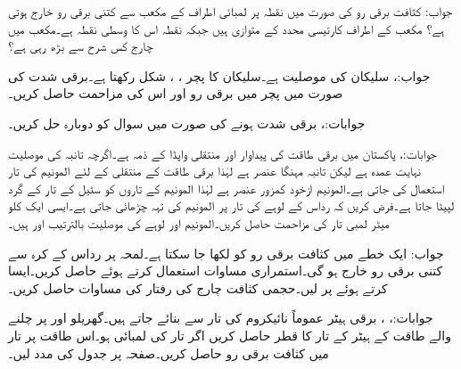 جواب:
کثافت برقی رو  کی صورت میں نقطہ  پر  لمبائی اطراف کے مکعب سے کتنی برقی رو خارج ہوتی ہے؟ مکعب کے اطراف کارتیسی محدد کے متوازی ہیں جبکہ نقطہ  اس کا وسطی نقطہ ہے۔مکعب میں چارج کس شرح سے بڑھ رہی ہے؟

جواب:، 
سلیکان کی موصلیت  ہے۔سلیکان کا پچر ، ،  شکل رکھتا ہے۔برقی شدت   کی صورت میں پچر میں برقی رو اور اس کی مزاحمت حاصل کریں۔

جوابات:، 
برقی شدت  ہونے کی صورت میں سوال  کو دوبارہ حل کریں۔

جوابات:، 
پاکستان میں برقی طاقت کی پیداوار اور منتقلی واپڈا کے ذمہ ہے۔اگرچہ تانبہ کی موصلیت نہایت عمدہ ہے لیکن تانبہ مہنگا عنصر ہے لہٰذا برقی طاقت کے منتقلی کے لئے المونیم کی تار استعمال کی جاتی ہے۔المونیم ازخود کمزور عنصر ہے لہٰذا المونیم کے تاروں کو سٹیل کے تار کے گرد لپیٹا جاتا ہے۔فرض کریں کہ   رداس کے لوہے کی تار پر  المونیم کی تہہ چڑھائی جاتی ہے۔ایسی ایک کلو میٹر لمبی تار کی مزاحمت حاصل کریں۔المونیم اور لوہے کی موصلیت بالترتیب  اور  ہیں۔
   
جواب:
ایک خطے میں کثافت برقی رو کو  لکھا جا سکتا ہے۔لمحہ  پر رداس  کے کرہ سے کتنی برقی رو خارج ہو گی۔استمراری مساوات  استعمال کرتے ہوئے   حاصل کریں۔ایسا کرتے ہوئے  پر  لیں۔حجمی کثافت چارج  کی رفتار کی مساوات حاصل کریں۔

جوابات:، ، 
برقی ہیٹر عموماً نائیکروم کی تار سے بنائے جاتے ہیں۔گھریلو  اور  پر چلنے والے  طاقت کے ہیٹر کے تار کا قطر حاصل کریں اگر تار کی لمبائی  ہو۔اس طاقت پر تار میں کثافت برقی رو حاصل کریں۔صفحہ  پر جدول  کی مدد لیں۔   

